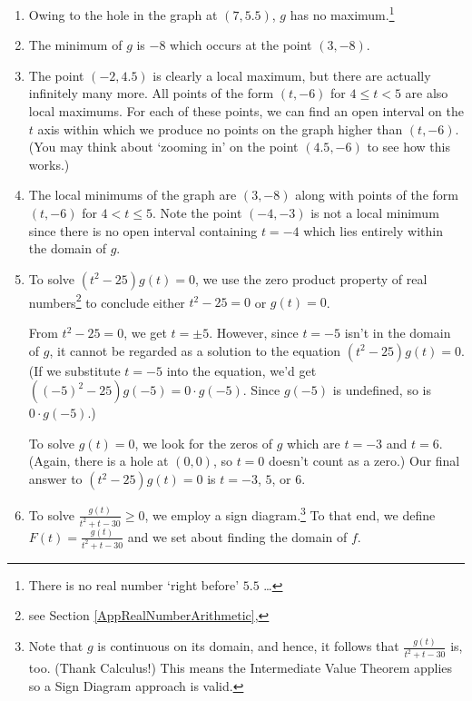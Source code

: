 \begin{ex}
\begin{enumerate}
\item  Owing to the hole in the graph at $(7, 5.5)$, $g$ has no maximum.\footnote{There is no real number `right before' $5.5$ \ldots}

\item  The minimum of $g$ is $-8$ which occurs at the point $(3,-8)$.

\item  The point $(-2, 4.5)$ is clearly a local maximum, but there are actually infinitely many more.   All points of the form $(t, -6)$ for $4 \leq t < 5$ are also local maximums.  For each of these points, we can find an open interval on the $t$ axis within which we produce no points on the graph higher than $(t,-6)$.  (You may think about `zooming in' on the point $(4.5, -6)$ to see how this works.)

\item  The local minimums of the graph are $(3,-8)$ along with points of the form $(t,-6)$ for $4< t \leq 5$.  Note the point $(-4,-3)$ is not a local minimum since there is no open interval containing $t=-4$ which lies entirely within the domain of $g$.

\item To solve $(t^2-25) g(t) = 0$, we use the zero product property of real numbers\footnote{see Section \ref{AppRealNumberArithmetic}, \pageref{propertiesofzero}} to conclude either $t^2-25 = 0$ or $g(t) = 0$.  

\smallskip

From $t^2-25 = 0$, we get $t = \pm 5$.  However, since $t=-5$ isn't in the domain of $g$, it cannot be regarded as a solution to the equation $(t^2-25)g(t) = 0$.  (If we substitute $t=-5$ into the equation, we'd get $((-5)^2-25)g(-5) = 0 \cdot g(-5)$.  Since  $g(-5)$ is undefined, so is $0 \cdot g(-5)$.)  

\smallskip

To solve $g(t) = 0$, we look for the zeros of $g$ which are $t = -3$ and $t = 6$. (Again, there is a hole at $(0,0)$, so $t=0$ doesn't count as a zero.)  Our final answer to $(t^2-25)g(t) = 0$ is $t = -3$, $5$, or $6$.

\item To solve  $\frac{g(t)}{t^2+t-30} \geq 0$, we employ a sign diagram.\footnote{Note that $g$ is continuous on its domain, and hence, it follows that  $\frac{g(t)}{t^2+t-30}$ is, too.  (Thank Calculus!)  This means the Intermediate Value Theorem applies so a Sign Diagram approach is valid.}  To that end, we define $F(t) = \frac{g(t)}{t^2+t-30}$ and we set about finding the domain of $f$.


\end{enumerate}
\end{ex}
